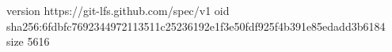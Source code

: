 version https://git-lfs.github.com/spec/v1
oid sha256:6fdbfc7692344972113511c25236192e1f3e50fdf925f4b391e85edadd3b6184
size 5616
